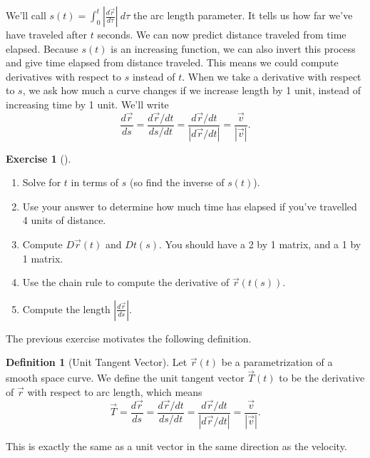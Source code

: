 \documentclass[10pt,]{book}
\theoremstyle{plain}
\theoremstyle{definition}
\newtheorem{definition}[theorem]{Definition}
\theoremstyle{definition}
\theoremstyle{definition}
\theoremstyle{definition}
\newtheorem{exploration}[project]{Exercise}
\theoremstyle{definition}
\numberwithin{equation}{section}
\newcommand{\ds}{\displaystyle}
\begin{document}
We'll call \(\ds s(t)=\int_0^t \left|\frac {d\vec r}{d\tau}\right|\ d\tau\) the arc length parameter. It tells us how far we've have traveled after \(t\) seconds. We can now predict distance traveled from time elapsed. Because \(s(t)\) is an increasing function, we can also invert this process and give time elapsed from distance traveled. This means we could compute derivatives with respect to \(s\) instead of \(t\). When we take a derivative with respect to \(s\), we ask how much a curve changes if we increase length by 1 unit, instead of increasing time by 1 unit. We'll write%
\begin{equation*}
\ds\frac{d\vec r}{ds} =\ds\frac{d\vec r/dt}{ds/dt} = \frac{d\vec r/dt}{|d\vec r/dt|} = \frac{\vec v}{|\vec{v}|}.
\end{equation*}
%
\begin{exploration}[]\label{exploration-167}
\leavevmode%
\begin{enumerate}[font=\bfseries,label=(\alph*),ref=\alph*]
\item\label{task-393} Solve for \(t\) in terms of \(s\) (so find the inverse of \(s(t)\)).%
\item\label{task-394} Use your answer to determine how much time has elapsed if you've travelled 4 units of distance.%
\item\label{task-395} Compute \(D\vec r(t)\) and \(Dt(s)\).  You should have a 2 by 1 matrix, and a 1 by 1 matrix.%
\item\label{task-396} Use the chain rule to compute the derivative of \(\vec r(t(s))\).%
\item\label{task-397} Compute the length \(\left|\ds\frac{d\vec r}{ds}\right|\).%
\end{enumerate}
\end{exploration}
The previous exercise motivates the following definition.%
\begin{definition}[{Unit Tangent Vector}]\label{def_unit_tangent_vector}
Let \(\vec r(t)\) be a parametrization of a smooth space curve. We define the unit tangent vector \(\vec T(t)\) to be the derivative of \(\vec r\) with respect to arc length, which means%
\begin{equation*}
\vec T = \ds\frac{d\vec r}{ds}=\ds\frac{d\vec r/dt}{ds/dt} = \frac{d\vec r/dt}{|d \vec r/dt|} = \frac{\vec v}{|\vec v|}.
\end{equation*}
%
\par
This is exactly the same as a unit vector in the same direction as the velocity.%
\end{definition}
\end{document}
